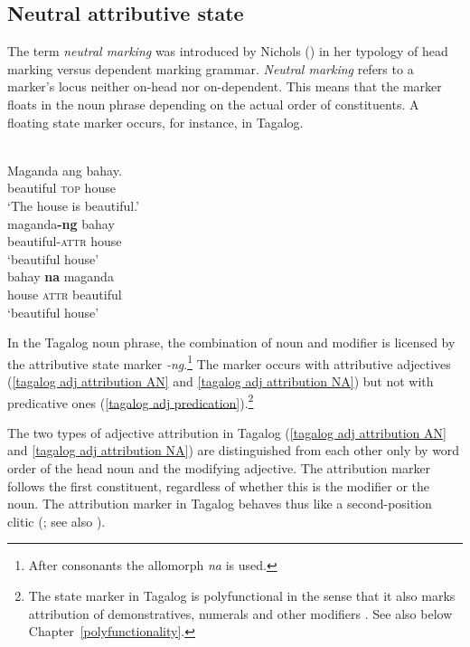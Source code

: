 \subsection{Neutral attributive state} \label{linker}
The term \emph{neutral marking} was introduced by Nichols (\citeyear{nichols1986}) in her typology of head marking versus dependent marking grammar. \emph{Neutral marking} refers to a marker's locus neither on-head nor on-dependent. This means that the marker floats in the noun phrase depending on the actual order of constituents. A floating state marker occurs, for instance, in Tagalog.
\begin{exe} 
\ex 
{} \label{tagalog linker}
\begin{xlist}
\\
\gll Maganda ang bahay.\\
	beautiful \textsc{top} house\\
\glt	‘The house is beautiful.’\label{tagalog adj predication}
\\
\gll maganda\textbf{-ng} bahay\\
	beautiful-\textsc{attr} house\\
\glt	‘beautiful house’\label{tagalog adj attribution AN}
\\
\gll bahay \textbf{na} maganda\\
	house \textsc{attr} beautiful\\
\glt	‘beautiful house’ \label{tagalog adj attribution NA}
\end{xlist}
\end{exe}
In the Tagalog noun phrase, the combination of noun and modifier is licens\-ed by the attributive state marker \textit{-ng}.\footnote{After consonants the allomorph \textit{na} is used.} The marker occurs with attributive adjectives (\ref{tagalog adj attribution AN} and \ref{tagalog adj attribution NA}) but not with predicative ones (\ref{tagalog adj predication}).\footnote{The state marker in Tagalog is polyfunctional in the sense that it also marks attribution of demonstratives, numerals and other modifiers \cite[160–161]{himmelmann1997}. See also below Chapter~\ref{polyfunctionality}.}

The two types of adjective attribution in Tagalog (\ref{tagalog adj attribution AN} and \ref{tagalog adj attribution NA}) are distinguished from each other only by word order of the head noun and the modifying adjective. The attribution marker follows the first constituent, regardless of whether this is the modifier or the noun. The attribution marker in Tagalog behaves thus like a second-position clitic (\citealt[65]{nichols1986}; see also \citealt[160, 162]{himmelmann1997}).

